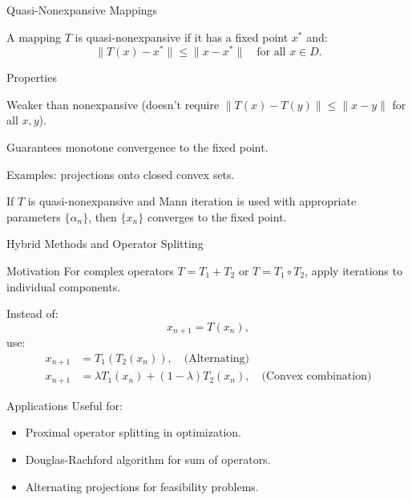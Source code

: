 \documentclass[aspectratio=169,10pt]{beamer}
\begin{document}
\begin{frame}{Quasi-Nonexpansive Mappings}
  \begin{definition}
    A mapping $T$ is quasi-nonexpansive if it has a fixed point $x^*$ and:
    \[
      \|T(x) - x^*\| \leq \|x - x^*\|
      \quad \text{for all } x \in D.
    \]
  \end{definition}

  \vspace{0.4cm}

  \begin{block}{Properties}
    \item Weaker than nonexpansive (doesn't require $\|T(x)-T(y)\| \leq \|x-y\|$ for all $x,y$).
    \item Guarantees monotone convergence to the fixed point.
    \item Examples: projections onto closed convex sets.
  \end{block}

  \vspace{0.4cm}

  \begin{theorem}
    If $T$ is quasi-nonexpansive and Mann iteration is used with appropriate
    parameters $\{\alpha_n\}$, then $\{x_n\}$ converges to the fixed point.
  \end{theorem}
\end{frame}

\begin{frame}{Hybrid Methods and Operator Splitting}
  \begin{block}{Motivation}
    For complex operators $T = T_1 + T_2$ or $T = T_1 \circ T_2$,
    apply iterations to individual components.
  \end{block}

  \vspace{0.3cm}

  \begin{definition}
    Instead of:
    \[
      x_{n+1} = T(x_n),
    \]
    use:
    \begin{align}
      x_{n+1} &= T_1(T_2(x_n)), \quad \text{(Alternating)} \\
      x_{n+1} &= \lambda T_1(x_n) + (1-\lambda) T_2(x_n), \quad \text{(Convex combination)}
    \end{align}
  \end{definition}

  \vspace{0.3cm}

  \begin{block}{Applications}
    Useful for:
    \begin{itemize}
      \item Proximal operator splitting in optimization.
      \item Douglas-Rachford algorithm for sum of operators.
      \item Alternating projections for feasibility problems.
    \end{itemize}
  \end{block}
\end{frame}
\end{document}
